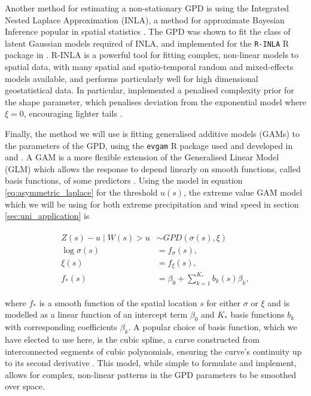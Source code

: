 \documentclass{article}
\numberwithin{equation}{section}
\begin{document}
Another method for estimating a non-stationary GPD is using the Integrated Nested Laplace Approximation (INLA), a method for approximate Bayesian Inference popular in spatial statistics \cite{Rue2009}.
The GPD was shown to fit the class of latent Gaussian models required of INLA, and implemented for the \texttt{R-INLA} R package in \cite{Opitz2018}.
R-INLA is a powerful tool for fitting complex, non-linear models to spatial data, with many spatial and spatio-temporal random and mixed-effects models available, and performs particularly well for high dimensional geostatistical data. 
In particular, \cite{Opitz2018} implemented a penalised complexity prior for the shape parameter, which penalises deviation from the exponential model where $\xi = 0$, encouraging lighter tails \cite{Simpson2015}.

Finally, the method we will use is fitting generalised additive models (GAMs) to the parameters of the GPD, using the \texttt{evgam} R package used and developed in \cite{Youngman2019} and \cite{Youngman2023}.
A GAM is a more flexible extension of the Generalised Linear Model (GLM) which allows the response to depend linearly on smooth functions, called basis functions, of some predictors \cite{Wood2006}.
Using the model in equation \ref{eq:asymmetric_laplace} for the threshold $u(s)$, the extreme value GAM model which we will be using for both extreme precipitation and wind speed in section \ref{sec:uni_application} is
\begin{center}
  \begin{align} \label{eq:gpd_gam}
    \begin{split}
      Z(s) - u \mid W(s) > u &\sim GPD(\sigma(s), \xi) \\
      \log{\sigma(s)} &= f_{\sigma}(s), \\
              \xi(s) &= f_{\xi}(s), \\
              f_*(s) &= \beta_0 + \sum_{k=1}^{K_*}b_k(s)\beta_k,
    \end{split}
  \end{align}
\end{center}
where $f_*$ is a smooth function of the spatial location $s$ for either $\sigma$ or $\xi$ and is modelled as a linear function of an intercept term $\beta_0$ and $K_*$ basis functions $b_k$ with corresponding coefficients $\beta_k$. %
A popular choice of basis function, which we have elected to use here, is the cubic spline, a curve constructed from interconnected segments of cubic polynomials, ensuring the curve's continuity up to its second derivative \cite{Wood2006}. 
This model, while simple to formulate and implement, allows for complex, non-linear patterns in the GPD parameters to be smoothed over space.
\end{document}
